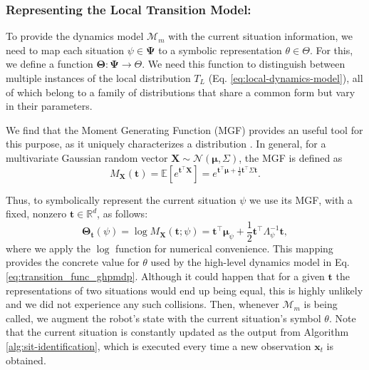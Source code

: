 \documentclass[Afour,sageh,times]{sagej}
\theoremstyle{lemma}
\begin{document}
\subsubsection{Representing the Local Transition Model:}

To provide the dynamics model $\mathcal{M}_m$ with the current situation information, we need to map each situation $\psi \in \boldsymbol{\Psi}$ to a symbolic representation $\theta \in \Theta$. For this, we define a function $\boldsymbol{\Theta} : \boldsymbol{\Psi} \rightarrow \Theta$. We need this function to distinguish between multiple instances of the local distribution $T_L$ (Eq. \ref{eq:local-dynamics-model}), all of which belong to a family of distributions that share a common form but vary in their parameters. 

We find that the Moment Generating Function (MGF) provides an useful tool for this purpose, as it uniquely characterizes a distribution \cite[Theorem 1]{curtiss1942note}. In general, for a multivariate Gaussian random vector \( \boldsymbol{X} \sim \mathcal{N}(\boldsymbol{\mu}, \Sigma) \), the MGF is defined as 
\begin{equation} \label{eq:mgf-multigaussian}
M_{\boldsymbol{X}}(\boldsymbol{t}) = \mathbb{E}[e^{\boldsymbol{t}^\top \boldsymbol{X}}] = e^{\boldsymbol{t}^\top \boldsymbol{\mu} + \frac{1}{2} \boldsymbol{t}^\top \Sigma \boldsymbol{t}}.
\end{equation}

Thus, to symbolically represent the current situation $\psi$ we use its MGF, with a fixed, nonzero $\boldsymbol{t} \in \mathbb{R}^d$, as follows: 
\begin{equation} \label{eq:situation_representation}
    \boldsymbol{\Theta}_{\boldsymbol{t}}(\psi) = \log M_{\boldsymbol{X}}(\boldsymbol{t}; \psi) = \boldsymbol{t}^\top \boldsymbol{\mu}_{\psi} + \frac{1}{2} \boldsymbol{t}^\top \Lambda^{-1}_{\psi} \boldsymbol{t},
\end{equation} 
where we apply the $\log$ function for numerical convenience. This mapping provides the concrete value for $\theta$ used by the high-level dynamics model in Eq. \eqref{eq:transition_func_ghpmdp}. Although it could happen that for a given $\boldsymbol{t}$ the representations of two situations would end up being equal, this is highly unlikely and we did not experience any such collisions. Then, whenever $\mathcal{M}_m$ is being called, we augment the robot's state with the current situation's symbol $\theta$. Note that the current situation is constantly updated as the output from Algorithm \ref{alg:sit-identification}, which is executed every time a new observation $\boldsymbol{x}_t$ is obtained.
\end{document}
